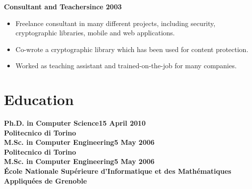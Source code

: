 \documentclass[a4paper,sans,10pt]{moderncv} %
\newcommand{\education}{Education}
\renewcommand{\education}{Formazione}
\renewcommand{\education}{Education}
\begin{document}
\vspace{0.5em}
  \textbf{Consultant and Teacher}\hfill\textbf{since 2003}\\
\vspace{-1em}
  \begin{itemize}
  \item Freelance consultant in many different projects, including security, cryptographic libraries, mobile and web applications.
  \item Co-wrote a cryptographic library which has been used for content protection.
  \item Worked as teaching assistant and trained-on-the-job for many companies.
  \end{itemize}

\section{\education}
  \textbf{Ph.D. in  Computer Science}\hfill\textbf{15 April 2010}\\
  \textbf{Politecnico di Torino}\\

  \textbf{M.Sc. in  Computer Engineering}\hfill\textbf{5 May 2006}\\
  \textbf{Politecnico di Torino}\\

  \textbf{M.Sc. in  Computer Engineering}\hfill\textbf{5 May 2006}\\
  \textbf{\'Ecole Nationale Sup\'erieure d'Informatique et des Math\'ematiques Appliqu\'ees de Grenoble}
\end{document}
